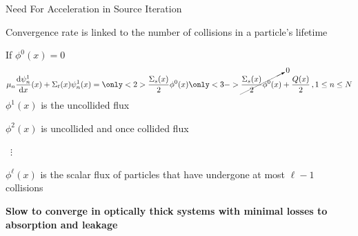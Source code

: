 \documentclass[10pt]{beamer}
\newcommand{\ud}{\mathop{}\!\mathrm{d}} %
\newcommand{\dderiv}[2]{\frac{\ud #1}{\ud #2}}
\begin{document}
\begin{frame}{Need For Acceleration in Source Iteration}

	Convergence rate is linked to the number of collisions in a particle's lifetime

    If $\phi^0(x) = 0$
    \begin{equation*}
        \mu_n \dderiv{\psi_n^{1}}{x}(x) + \Sigma_t(x) \psi_n^{1}(x) =
        \vphantom{\cancelto{0}{\frac{\Sigma_s(x)}{2} \phi^{0}(x)}} 
        \only<2>{\frac{\Sigma_s(x)}{2} \phi^{0}(x)}
        \only<3->{\cancelto{0}{\frac{\Sigma_s(x)}{2} \phi^{0}(x)}}
         + \frac{Q(x)}{2} \,, 1 \leq n \leq N 
    \end{equation*}
    $\phi^1(x) $ is the uncollided flux 

    $\phi^2(x)$ is uncollided and once collided flux 

    \ $\vdots$

    $\phi^{\ell}(x)$ is the scalar flux of particles that have undergone at most $\ell - 1$ collisions 

    \textbf{Slow to converge in optically thick systems with minimal losses to absorption and leakage}

\end{frame}







\end{document}
